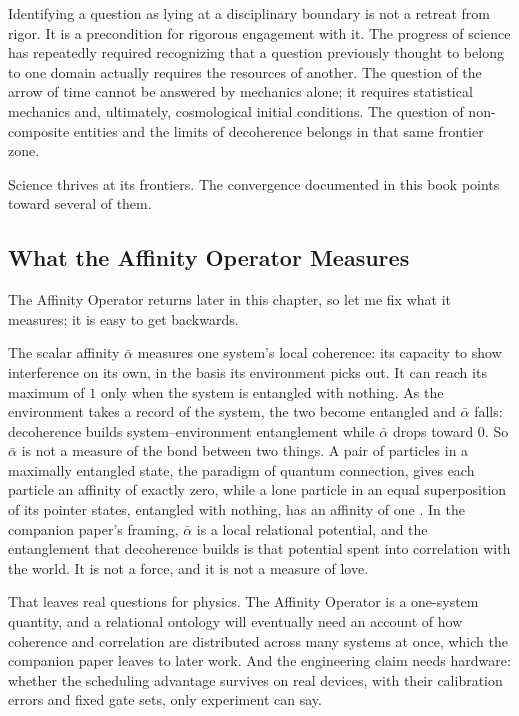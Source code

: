 Identifying a question as lying at a disciplinary boundary is not a retreat from
rigor.  It is a precondition for rigorous engagement with it.  The progress of
science has repeatedly required recognizing that a question previously thought
to belong to one domain actually requires the resources of another.  The
question of the arrow of time cannot be answered by mechanics alone; it requires
statistical mechanics and, ultimately, cosmological initial conditions.  The question of
non-composite entities and the limits of decoherence belongs in that same
frontier zone.

Science thrives at its frontiers.  The convergence documented in this book points
toward several of them.

\subsection*{What the Affinity Operator Measures}

The Affinity Operator returns later in this chapter, so let me fix what it
measures; it is easy to get backwards.

The scalar affinity $\bar{\alpha}$ measures one system's local coherence: its
capacity to show interference on its own, in the basis its environment picks
out.  It can reach its maximum of $1$ only when the system is entangled with
nothing.  As the environment takes a record of the system, the two become
entangled and $\bar{\alpha}$ falls: decoherence builds system--environment
entanglement while $\bar{\alpha}$ drops toward $0$.  So $\bar{\alpha}$ is not a
measure of the bond between two things.  A pair of particles in a maximally
entangled state, the paradigm of quantum connection, gives each particle an
affinity of exactly zero, while a lone particle in an equal superposition of
its pointer states, entangled with nothing, has an affinity of one
\citep{AdamsRCT}.  In the companion paper's framing, $\bar{\alpha}$ is a local
relational potential, and the entanglement that decoherence builds is that
potential spent into correlation with the world.  It is not a force, and it is
not a measure of love.

That leaves real questions for physics.  The Affinity Operator is a one-system
quantity, and a relational ontology will eventually need an account of how
coherence and correlation are distributed across many systems at once, which
the companion paper leaves to later work.  And the engineering claim needs
hardware: whether the scheduling advantage survives on real devices, with
their calibration errors and fixed gate sets, only experiment can say.


